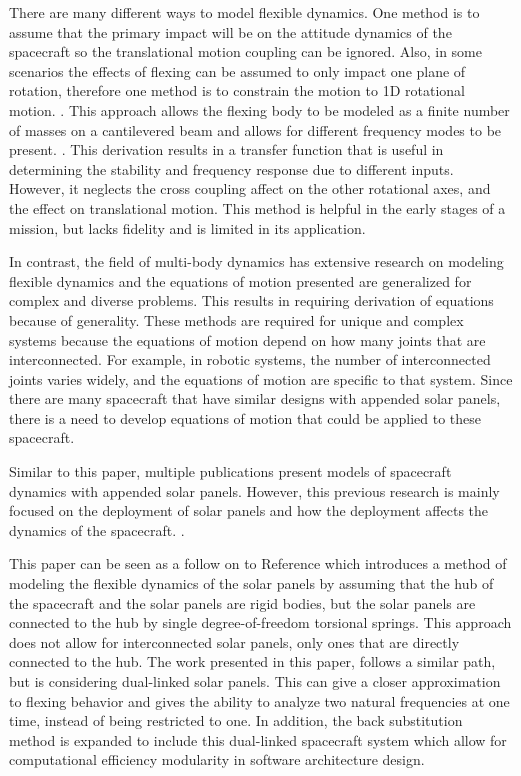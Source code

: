 \documentclass[paper]{aiaaNew}
\begin{document}
There are many different ways to model flexible dynamics. One method is to assume that the primary impact will be on the attitude dynamics of the spacecraft so the translational motion coupling can be ignored. Also, in some scenarios the effects of flexing can be assumed to only impact one plane of rotation, therefore one method is to constrain the motion to 1D rotational motion. \cite{sidi1997spacecraft}. This approach allows the flexing body to be modeled as a finite number of masses on a cantilevered beam and allows for different frequency modes to be present. \cite{sidi1997spacecraft}. This derivation results in a transfer function that is useful in determining the stability and frequency response due to different inputs. However, it neglects the cross coupling affect on the other rotational axes, and the effect on translational motion. This method is helpful in the early stages of a mission, but lacks fidelity and is limited in its application.

In contrast, the field of multi-body dynamics has extensive research on modeling flexible dynamics and the equations of motion presented are generalized for complex and diverse problems. This results in requiring derivation of equations because of generality. \cite{angeles2014kinematics, fleischer1974attitude,jerkovsky1978structure} These methods are required for unique and complex systems because the equations of motion depend on how many joints that are interconnected. For example, in robotic systems, the number of interconnected joints varies widely, and the equations of motion are specific to that system. \cite{zarafshan2010manipulation,moosavian2004explicit} Since there are many spacecraft that have similar designs with appended solar panels, there is a need to develop equations of motion that could be applied to these spacecraft. 

Similar to this paper, multiple publications present models of spacecraft dynamics with appended solar panels. \cite{kuang2004nonlinear,wallrapp2002simulation,wie1986modeling} However, this previous research is mainly focused on the deployment of solar panels and how the deployment affects the dynamics of the spacecraft. \cite{kuang2004nonlinear,wallrapp2002simulation,wie1986modeling}.

This paper can be seen as a follow on to Reference\cite{Allard2016rz} which introduces a method of modeling the flexible dynamics of the solar panels by assuming that the hub of the spacecraft and the solar panels are rigid bodies, but the solar panels are connected to the hub by single degree-of-freedom torsional springs. This approach does not allow for interconnected solar panels, only ones that are directly connected to the hub. The work presented in this paper, follows a similar path, but is considering dual-linked solar panels. This can give a closer approximation to flexing behavior and gives the ability to analyze two natural frequencies at one time, instead of being restricted to one. In addition, the back substitution method is expanded to include this dual-linked spacecraft system which allow for computational efficiency modularity in software architecture design.
		
\end{document}
